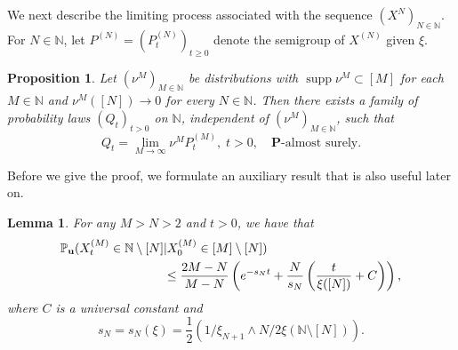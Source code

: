 \documentclass[11pt,a4paper]{scrartcl}
\numberwithin{equation}{section}
\theoremstyle{plain}
\newtheorem{lemma}[theorem]{Lemma}
\newtheorem{proposition}[theorem]{Proposition}
\theoremstyle{definition}
\theoremstyle{remark}
\DeclareMathOperator{\supp}{supp}
\newcommand{\bN}{\ensuremath{\mathbb{N}}}
\newcommand{\bP}{\ensuremath{\mathbb{P}}}
\newcommand{\bPu}{\bP_\mathbf{u}}
\newcommand{\bfP}{\mathbf{P}}
\begin{document}
We next describe the limiting process associated with the sequence $(X^{N})_{N\in\bN}$. For $N\in\bN$, let $P^{(N)}=(P^{(N)}_t)_{t\geq0}$ denote the semigroup of $X^{(N)}$ given $\xi.$
\begin{proposition}\label{prop:Qexistence}
Let $(\nu^M)_{M\in\bN}$ be distributions with $\supp\nu^M\subset[M]$ for each $M\in\bN$ and $\nu^M([N])\to0$ for every $N\in\bN$. Then there exists a family of probability laws $(Q_t)_{t>0}$ on $\bN$, independent of $(\nu^M)_{M\in\bN}$, such that
$$
	Q_t = \lim_{M\to\infty} \nu^M P^{(M)}_t,\; t>0,\quad \bfP\text{-almost surely.}
$$
\end{proposition}
Before we give the proof, we formulate an auxiliary result that is also useful later on.
\begin{lemma}\label{lem:Tailbound}
For any $M>N>2$ and $t>0$, we have that
\begin{equation*}\begin{aligned}
 \bPu(X^{(M)}_t\in \bN\setminus[N] & |X_0^{(M)}\in[M]\setminus[N])\\
& \leq \frac{2M-N}{M-N}\left( \textup{e}^{-s_Nt}+\frac{N}{s_N}\left(\frac{t}{\xi([N])}+ C\right)\right),
\end{aligned}
\end{equation*}
where $C$ is a universal constant and
$$s_N=s_N(\xi)=\frac{1}{2}\left(1/\xi_{N+1} \wedge N/2\xi(\bN\setminus[N])\right).$$

\end{lemma}
\end{document}
